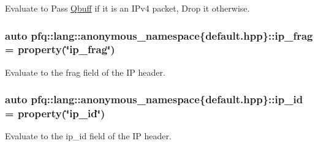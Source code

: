 Evaluate to {\ttfamily Pass} \hyperlink{structpfq_1_1lang_1_1Qbuff}{Qbuff} if it is an I\+Pv4 packet, {\ttfamily Drop} it otherwise. 

\subsubsection[{\texorpdfstring{ip\+\_\+frag}{ip_frag}}]{\setlength{\rightskip}{0pt plus 5cm}auto pfq\+::lang\+::anonymous\+\_\+namespace\{default.\+hpp\}\+::ip\+\_\+frag = {\bf property}(\char`\"{}ip\+\_\+frag\char`\"{})}\hypertarget{namespacepfq_1_1lang_1_1anonymous__namespace_02default_8hpp_03_a46050d7137792fba0ca6d1b9cb75ad0d}{}\label{namespacepfq_1_1lang_1_1anonymous__namespace_02default_8hpp_03_a46050d7137792fba0ca6d1b9cb75ad0d}


Evaluate to the {\ttfamily frag} field of the IP header. 

\subsubsection[{\texorpdfstring{ip\+\_\+id}{ip_id}}]{\setlength{\rightskip}{0pt plus 5cm}auto pfq\+::lang\+::anonymous\+\_\+namespace\{default.\+hpp\}\+::ip\+\_\+id = {\bf property}(\char`\"{}ip\+\_\+id\char`\"{})}\hypertarget{namespacepfq_1_1lang_1_1anonymous__namespace_02default_8hpp_03_a87620275a9e9760978d5660be0582852}{}\label{namespacepfq_1_1lang_1_1anonymous__namespace_02default_8hpp_03_a87620275a9e9760978d5660be0582852}


Evaluate to the {\ttfamily ip\+\_\+id} field of the IP header. 


